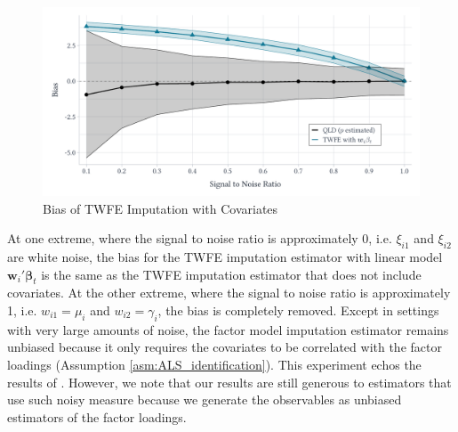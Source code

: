 \documentclass[12pt]{article}
\begin{document}
\begin{figure}
  \begin{adjustbox}{width=.8\textwidth, center}
    \includegraphics{figures/simulation-2/bias_signal_to_noise.pdf}
  \end{adjustbox}
  \caption{Bias of TWFE Imputation with Covariates}\label{fig:noisy_w}

\end{figure}

At one extreme, where the signal to noise ratio is approximately 0, i.e. $\xi_{i1}$ and $\xi_{i2}$ are white noise, the bias for the TWFE imputation estimator with linear model $\bm w_i' \bm \beta_t$ is the same as the TWFE imputation estimator that does not include covariates. At the other extreme, where the signal to noise ratio is approximately 1, i.e. $w_{i1} = \mu_i$ and $w_{i2} = \gamma_i$, the bias is completely removed. Except in settings with very large amounts of noise, the factor model imputation estimator remains unbiased because it only requires the covariates to be correlated with the factor loadings (Assumption \ref{asm:ALS_identification}). This experiment echos the results of \citet{kejriwal2024efficacy}. However, we note that our results are still generous to estimators that use such noisy measure because we generate the observables as unbiased estimators of the factor loadings. 
\end{document}
